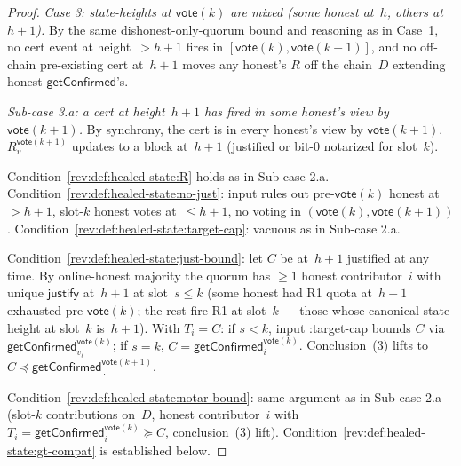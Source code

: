 \documentclass{article}
\newcommand{\just}{\ensuremath{\mathsf{justify}}\xspace}
\newcommand{\vote}{\mathsf{vote}}
\newcommand{\getConfirmed}{\textsf{getConfirmed}\xspace}
\theoremstyle{plain}
\theoremstyle{definition}
\theoremstyle{remark}
\newcommand{\OHM}{online-honest majority\xspace}
\begin{document}
\begin{proof}
\emph{Case 3: state-heights at $\vote(k)$ are mixed (some honest at~$h$, others at~$h+1$).}
By the same dishonest-only-quorum bound and  reasoning as in Case~1, no cert event at height~$>h+1$ fires in $[\vote(k),\vote(k+1)]$, and no off-chain pre-existing cert at~$h+1$ moves any honest's $R$ off the chain~$D$ extending honest $\getConfirmed$'s.

\emph{Sub-case 3.a: a cert at height~$h+1$ has fired in some honest's view by $\vote(k+1)$.}
By synchrony, the cert is in every honest's view by $\vote(k+1)$. $R_v^{\vote(k+1)}$ updates to a block at~$h+1$ (justified or bit-$0$ notarized for slot~$k$).

Condition~\ref{rev:def:healed-state:R} holds as in Sub-case 2.a. Condition~\ref{rev:def:healed-state:no-just}: input rules out pre-$\vote(k)$ honest at~$>h+1$, slot-$k$ honest votes at~$\leq h+1$, no voting in $(\vote(k),\vote(k+1))$. Condition~\ref{rev:def:healed-state:target-cap}: vacuous as in Sub-case 2.a.

Condition~\ref{rev:def:healed-state:just-bound}: let $C$ be at~$h+1$ justified at any time. By \OHM the quorum has $\geq 1$ honest contributor~$i$ with unique \just at~$h+1$ at slot~$s \leq k$ (some honest had R1 quota at~$h+1$ exhausted pre-$\vote(k)$; the rest fire R1 at slot~$k$ — those whose canonical state-height at slot~$k$ is~$h+1$). With $T_i = C$: if $s < k$, input :target-cap bounds $C$ via $\getConfirmed_{v_\ell}^{\vote(k)}$; if $s = k$, $C = \getConfirmed_i^{\vote(k)}$. Conclusion~(3) lifts to $C \preceq \getConfirmed_{\,\cdot\,}^{\vote(k+1)}$.

Condition~\ref{rev:def:healed-state:notar-bound}: same argument as in Sub-case 2.a (slot-$k$ contributions on~$D$, honest contributor~$i$ with $T_i = \getConfirmed_i^{\vote(k)} \succeq C$, conclusion~(3) lift). Condition~\ref{rev:def:healed-state:gt-compat} is established below.


\end{proof}
\end{document}
